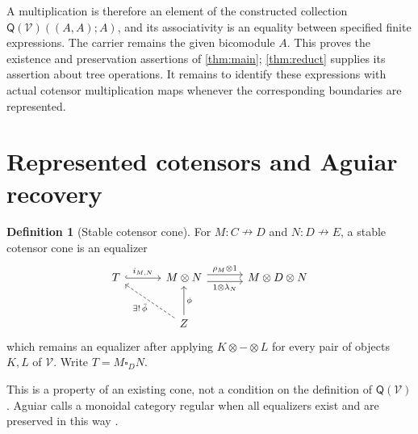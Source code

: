 \documentclass[11pt,reqno]{amsart}
\theoremstyle{plain}
\theoremstyle{definition}
\newtheorem{definition}[theorem]{Definition}
\theoremstyle{remark}
\numberwithin{equation}{section}
\newcommand{\V}{\mathcal V}
\newcommand{\Q}{\mathsf Q}
\newcommand{\harr}{\mathrel{\nrightarrow}}
\begin{document}
A multiplication is therefore an element of the constructed collection
$\Q(\V)((A,A);A)$, and its associativity is an equality between
specified finite expressions. The carrier remains the given bicomodule
$A$. This proves the existence and preservation assertions of
\cref{thm:main}; \cref{thm:reduct} supplies its assertion about tree
operations. It remains to identify these expressions with actual
cotensor multiplication maps whenever the corresponding boundaries are
represented.

\section{Represented cotensors and Aguiar recovery}\label{sec:recovery}

\begin{definition}[Stable cotensor cone]\label{def:stable}
For $M:C\harr D$ and $N:D\harr E$, a stable cotensor cone is an
equalizer
\begin{equation}\label{eq:cotensorfork}
\begin{tikzcd}[column sep=3.2em,row sep=2.6em]
T \arrow[r,hook,"i_{M,N}"] &
M\otimes N \arrow[r,shift left=.7ex,"\rho_M\otimes1"]
  \arrow[r,shift right=.7ex,"1\otimes\lambda_N"'] & M\otimes D\otimes N\\
& Z \arrow[u,"\phi"'] \arrow[ul,dashed,"\exists!\,\bar\phi"] &
\end{tikzcd}
\end{equation}
which remains an equalizer after applying $K\otimes-\otimes L$ for
every pair of objects $K,L$ of $\V$. Write $T=M\square_D N$.
\end{definition}

This is a property of an existing cone, not a condition on the definition
of $\Q(\V)$. Aguiar calls a monoidal category regular when all
equalizers exist and are preserved in this way
\cite[Definition 2.1.1]{Aguiar1997}.
\end{document}
